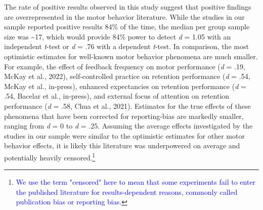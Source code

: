 \documentclass[
  man, donotrepeattitle,mask,floatsintext]{apa7}
\begin{document}
The rate of positive results observed in this study suggest that positive findings are overrepresented in the motor behavior literature. While the studies in our sample reported positive results 84\% of the time, the median per group sample size was \textasciitilde17, which would provide 84\% power to detect \emph{d} = 1.05 with an independent \emph{t}-test or \emph{d} = .76 with a dependent \emph{t}-test. In comparison, the most optimistic estimates for well-known motor behavior phenomena are much smaller. For example, the effect of feedback frequency on motor performance (\emph{d} = .19, McKay et al., 2022), self-controlled practice on retention performance (\emph{d} = .54, McKay et al., in-press), enhanced expectancies on retention performance (\emph{d} = .54, Bacelar et al., in-press), and external focus of attention on retention performance (\emph{d} = .58, Chua et al., 2021). Estimates for the true effects of these phenomena that have been corrected for reporting-bias are markedly smaller, ranging from \emph{d} = 0 to \emph{d} = .25. Assuming the average effects investigated by the studies in our sample were similar to the optimistic estimates for other motor behavior effects, it is likely this literature was underpowered on average and potentially heavily censored.\footnote{\textcolor{blue}{We use the term "censored" here to mean that some experiments fail to enter the published literature for results-dependent reasons, commonly called publication bias or reporting bias.}}
\end{document}
